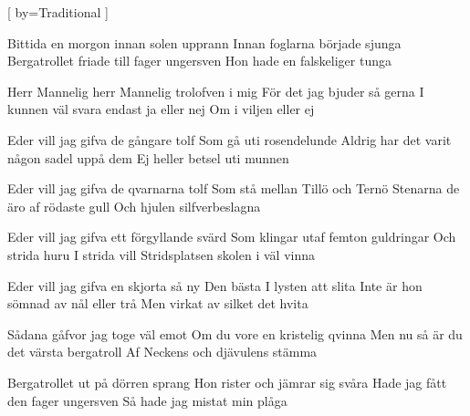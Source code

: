 [
	by={Traditional}
]

\beginverse
Bittida en morgon innan solen upprann
Innan foglarna började sjunga
Bergatrollet friade till fager ungersven
Hon hade en falskeliger tunga
\endverse

\beginchorus
Herr Mannelig herr Mannelig trolofven i mig
För det jag bjuder så gerna
I kunnen väl svara endast ja eller nej
Om i viljen eller ej
\endchorus

\beginverse
Eder vill jag gifva de gångare tolf
Som gå uti rosendelunde
Aldrig har det varit någon sadel uppå dem
Ej heller betsel uti munnen
\endverse

\beginverse
Eder vill jag gifva de qvarnarna tolf
Som stå mellan Tillö och Ternö
Stenarna de äro af rödaste gull
Och hjulen silfverbeslagna
\endverse

\beginverse
Eder vill jag gifva ett förgyllande svärd
Som klingar utaf femton guldringar
Och strida huru I strida vill
Stridsplatsen skolen i väl vinna
\endverse

\beginverse
Eder vill jag gifva en skjorta så ny
Den bästa I lysten att slita
Inte är hon sömnad av nål eller trå
Men virkat av silket det hvita
\endverse

\beginverse
Sådana gåfvor jag toge väl emot
Om du vore en kristelig qvinna
Men nu så är du det värsta bergatroll
Af Neckens och djävulens stämma
\endverse

\beginverse
Bergatrollet ut på dörren sprang
Hon rister och jämrar sig svåra
Hade jag fått den fager ungersven
Så hade jag mistat min plåga
\endverse

\endsong